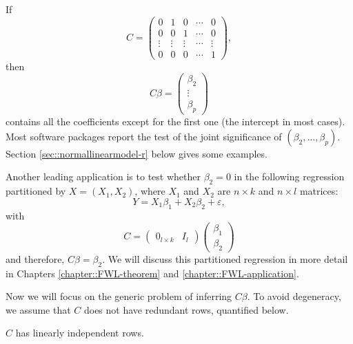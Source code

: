 \begin{example}\label{eg::testing-1}
If
\[
C=\left(\begin{array}{ccccc}
0 & 1 & 0 & \cdots & 0\\
0 & 0 & 1 & \cdots & 0\\
\vdots & \vdots & \vdots & \cdots & \vdots\\
0 & 0 & 0 & \cdots & 1
\end{array}\right) , 
\]
then 
\[
C\beta=\left(\begin{array}{c}
\beta_{2}\\
\vdots\\
\beta_{p}
\end{array}\right) 
\]
contains all the coefficients except for the first one (the
intercept in most cases). Most software packages report the test of
the joint significance of $(\beta_{2}, \ldots, \beta_{p})$. Section \ref{sec::normallinearmodel-r} below gives some examples. 
\end{example}

\begin{example}\label{eg::partition-reg-F}
Another
leading application is to test whether $\beta_{2}=0$ in the following
regression partitioned by $X=(X_{1},X_{2})$, where $X_{1}$ and $X_{2}$
are $n\times k$ and $n\times l$ matrices:
\[
Y=X_{1}\beta_{1}+X_{2}\beta_{2}+\varepsilon,
\]
 with
\[
C=\left(\begin{array}{cc}
0_{l\times k} & I_{l}\end{array}\right)\left(\begin{array}{c}
\beta_{1}\\
\beta_{2}
\end{array}\right)
\]
and therefore, $ C\beta=\beta_{2}.$
 We will discuss this partitioned regression in more detail in Chapters \ref{chapter::FWL-theorem} and \ref{chapter::FWL-application}.
 \end{example}
 
Now we will focus on the generic problem of inferring $C\beta$.
To avoid degeneracy, we assume that $C$ does not have redundant rows, quantified below. 

\begin{assumption}\label{assume::c-non-degenerate}
 $C$ has linearly independent
rows. 
\end{assumption}


